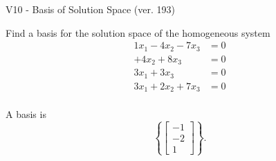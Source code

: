 \begin{exercise}
  \begin{exerciseTitle}V10 - Basis of Solution Space (ver. 193)\end{exerciseTitle}
  \begin{exerciseStatement}
    Find a basis for the solution space of the homogeneous system 
\begin{align*}
 1 x_ 1 -4 x_ 2 -7 x_ 3 &= 0  \\ 
  + 4 x_ 2 + 8 x_ 3 &= 0  \\ 
  3 x_ 1 + 3 x_ 3 &= 0  \\ 
  3 x_ 1 + 2 x_ 2 + 7 x_ 3 &= 0  \\ 
 \end{align*}


 
  \end{exerciseStatement}

  \begin{exerciseAnswer}
   A basis is   
\[\left\{\left[\begin{array}{c}
-1 \\
-2 \\
1
\end{array}\right]\right\}.\]

  


  \end{exerciseAnswer}
\end{exercise}